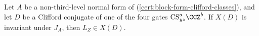 Let $A$ be a non-third-level normal form of \textup{(\ref{cert:block-form-clifford-classes})}, and let $D$ be a Clifford conjugate of one of the four gates $\mathrm{CS}_{yz}^a\CCZ^b$. If $X(D)$ is invariant under $J_A$, then $L_Z\in X(D)$.
